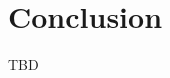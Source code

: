 \documentclass[article,11pt,letterpaper,fleqn]{article}
\theoremstyle{definition}
\numberwithin{equation}{section}
\begin{document}



\section{Conclusion}
\label{sec:conclusion}

TBD



\newpage




\newpage




\newpage


\end{document}
